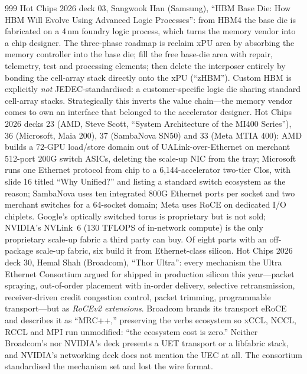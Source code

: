 \begin{thebibliography}{999}
 Hot Chips 2026 deck 03, Sangwook Han (Samsung), ``HBM Base Die: How HBM Will Evolve Using Advanced Logic Processes'': from HBM4 the base die is fabricated on a 4\,nm foundry logic process, which turns the memory vendor into a chip designer. The three-phase roadmap is reclaim xPU area by absorbing the memory controller into the base die; fill the free base-die area with repair, telemetry, test and processing elements; then delete the interposer entirely by bonding the cell-array stack directly onto the xPU (``zHBM''). Custom HBM is explicitly \emph{not} JEDEC-standardised: a customer-specific logic die sharing standard cell-array stacks. Strategically this inverts the value chain---the memory vendor comes to own an interface that belonged to the accelerator designer.
 Hot Chips 2026 decks 23 (AMD, Steve Scott, ``System Architecture of the MI400 Series''), 36 (Microsoft, Maia 200), 37 (SambaNova SN50) and 33 (Meta MTIA 400): AMD builds a 72-GPU load/store domain out of UALink-over-Ethernet on merchant 512-port 200G switch ASICs, deleting the scale-up NIC from the tray; Microsoft runs one Ethernet protocol from chip to a 6{,}144-accelerator two-tier Clos, with slide 16 titled ``Why Unified?'' and listing a standard switch ecosystem as the reason; SambaNova uses ten integrated 800G Ethernet ports per socket and two merchant switches for a 64-socket domain; Meta uses RoCE on dedicated I/O chiplets. Google's optically switched torus is proprietary but is not sold; NVIDIA's NVLink~6 (130 TFLOPS of in-network compute) is the only proprietary scale-up fabric a third party can buy. Of eight parts with an off-package scale-up fabric, six build it from Ethernet-class silicon.
 Hot Chips 2026 deck 30, Hemal Shah (Broadcom), ``Thor Ultra'': every mechanism the Ultra Ethernet Consortium argued for shipped in production silicon this year---packet spraying, out-of-order placement with in-order delivery, selective retransmission, receiver-driven credit congestion control, packet trimming, programmable transport---but as \emph{RoCEv2 extensions}. Broadcom brands its transport eRoCE and describes it as ``MRC++,'' preserving the verbs ecosystem so xCCL, NCCL, RCCL and MPI run unmodified: ``the ecosystem cost is zero.'' Neither Broadcom's nor NVIDIA's deck presents a UET transport or a libfabric stack, and NVIDIA's networking deck does not mention the UEC at all. The consortium standardised the mechanism set and lost the wire format.

\end{thebibliography}
